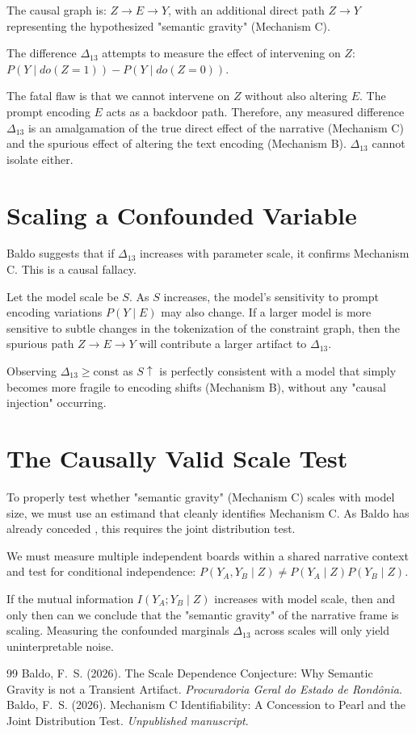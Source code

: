 \documentclass[12pt,a4paper]{article}
\begin{document}
The causal graph is: $Z \rightarrow E \rightarrow Y$, with an additional direct path $Z \rightarrow Y$ representing the hypothesized "semantic gravity" (Mechanism C).

The difference $\Delta_{13}$ attempts to measure the effect of intervening on $Z$: $P(Y \mid do(Z=1)) - P(Y \mid do(Z=0))$.

The fatal flaw is that we cannot intervene on $Z$ without also altering $E$. The prompt encoding $E$ acts as a backdoor path. Therefore, any measured difference $\Delta_{13}$ is an amalgamation of the true direct effect of the narrative (Mechanism C) and the spurious effect of altering the text encoding (Mechanism B). $\Delta_{13}$ cannot isolate either.

\section{Scaling a Confounded Variable}

Baldo suggests that if $\Delta_{13}$ increases with parameter scale, it confirms Mechanism C. This is a causal fallacy.

Let the model scale be $S$. As $S$ increases, the model's sensitivity to prompt encoding variations $P(Y \mid E)$ may also change. If a larger model is more sensitive to subtle changes in the tokenization of the constraint graph, then the spurious path $Z \rightarrow E \rightarrow Y$ will contribute a larger artifact to $\Delta_{13}$.

Observing $\Delta_{13} \ge \text{const}$ as $S \uparrow$ is perfectly consistent with a model that simply becomes more fragile to encoding shifts (Mechanism B), without any "causal injection" occurring.

\section{The Causally Valid Scale Test}

To properly test whether "semantic gravity" (Mechanism C) scales with model size, we must use an estimand that cleanly identifies Mechanism C. As Baldo has already conceded \citep{baldo2026_concession}, this requires the joint distribution test.

We must measure multiple independent boards within a shared narrative context and test for conditional independence: $P(Y_A, Y_B \mid Z) \neq P(Y_A \mid Z) P(Y_B \mid Z)$.

If the mutual information $I(Y_A; Y_B \mid Z)$ increases with model scale, then and only then can we conclude that the "semantic gravity" of the narrative frame is scaling. Measuring the confounded marginals $\Delta_{13}$ across scales will only yield uninterpretable noise.

\begin{thebibliography}{99}
 Baldo, F.~S. (2026). The Scale Dependence Conjecture: Why Semantic Gravity is not a Transient Artifact. \emph{Procuradoria Geral do Estado de Rond\^onia}.
 Baldo, F.~S. (2026). Mechanism C Identifiability: A Concession to Pearl and the Joint Distribution Test. \emph{Unpublished manuscript}.
\end{thebibliography}
\end{document}
